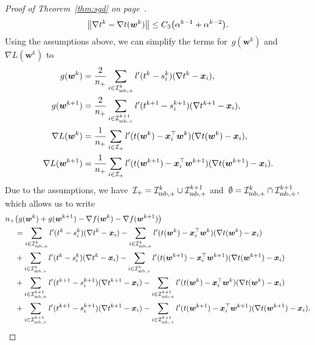 \begin{proof}[Proof of Theorem~\ref{thm:sgd} on page~\pageref{thm:sgd}]
  \begin{equation}\label{eq:sgd_nablat_diff}
    \norm{\nabla t^k - \nabla t(\bm{w}^k)} \leq C_3\Brac{\alpha^{k-1} + \alpha^{k-2}}.
  \end{equation}
  Using the assumptions above, we can simplify the terms for~$g(\bm{w}^k)$ and~$\nabla L(\bm{w}^k)$ to
  \begin{equation*}
    \begin{aligned}
      g(\bm{w}^k)
        & = \frac{2}{n_{+}} \sum_{i \in \mathcal{I}_{\text{mb},+}^k} l'(t^k - s_i^k)(\nabla t^k - \bm{x}_i), \\
      g(\bm{w}^{k+1})
        & = \frac{2}{n_{+}} \sum_{i \in \mathcal{I}_{\text{mb},+}^{k+1}} l'(t^{k+1}-s_i^{k+1})(\nabla t^{k+1} - \bm{x}_i), \\
      \nabla L(\bm{w}^k)
        & = \frac{1}{n_{+}} \sum_{i \in \mathcal{I}_{+}} l'(t(\bm{w}^k) - \bm{x}_i^\top \bm{w}^k)(\nabla t(\bm{w}^k) - \bm{x}_i), \\
      \nabla L(\bm{w}^{k+1})
        & = \frac{1}{n_{+}} \sum_{i \in \mathcal{I}_{+}} l'(t(\bm{w}^{k+1}) - \bm{x}_i^\top \bm{w}^{k+1})(\nabla t(\bm{w}^{k+1}) - \bm{x}_i).
    \end{aligned}
  \end{equation*}
  Due to the assumptions, we have~$\mathcal{I}_{+} = \mathcal{I}_{\text{mb},+}^k \cup \mathcal{I}_{\text{mb},+}^{k+1}$ and~$\emptyset = \mathcal{I}_{\text{mb},+}^k \cap \mathcal{I}_{\text{mb},+}^{k+1}$, which allows us to write
  \begin{subequations}\label{eq:sgd_sum}
    \begin{align}
    \label{eq:sgd_sum1}
    \npos & \Brac{g(\bm{w}^k) + g(\bm{w}^{k+1}) - \nabla f(\bm{w}^k)-\nabla f(\bm{w}^{k+1})}\\
    \label{eq:sgd_sum2}
    & = \sum_{i \in \Imbpos^k} l'(t^k - s_i^k)(\nabla t^k - \bm{x}_i) - \sum_{i \in \Imbpos^k} l'(t(\bm{w}^k) - \bm{x}_i^\top \bm{w}^k)(\nabla t(\bm{w}^k) - \bm{x}_i) \\
    \label{eq:sgd_sum3}
    & + \sum_{i \in \Imbpos^k} l'(t^k - s_i^k)(\nabla t^k - \bm{x}_i) - \sum_{i \in \Imbpos^k} l'(t(\bm{w}^{k+1}) - \bm{x}_i^\top \bm{w}^{k+1})(\nabla t(\bm{w}^{k+1}) - \bm{x}_i)\\
    \label{eq:sgd_sum4}
    & + \sum_{i \in \Imbpos^{k+1}} l'(t^{k+1} - s_i^{k+1})(\nabla t^{k+1} - \bm{x}_i) - \sum_{i\in \Imbpos^{k+1}}l'(t(\bm{w}^k) - \bm{x}_i^\top \bm{w}^k)(\nabla t(\bm{w}^k) - \bm{x}_i) \\
    \label{eq:sgd_sum5}
    & + \sum_{i \in \Imbpos^{k+1}} l'(t^{k+1} - s_i^{k+1})(\nabla t^{k+1} - \bm{x}_i)  - \sum_{i \in \Imbpos^{k+1}} l'(t(\bm{w}^{k+1}) - \bm{x}_i^\top \bm{w}^{k+1})(\nabla t(\bm{w}^{k+1}) - \bm{x}_i).

\end{align}
\end{subequations}
\end{proof}
